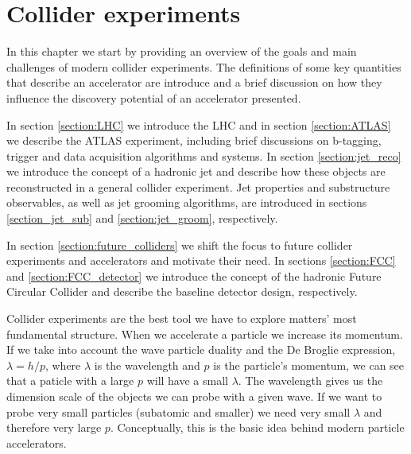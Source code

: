 
\chapter{Collider experiments}
\label{chapter:exp}

In this chapter we start by providing an overview of the goals and main challenges of modern collider experiments. The definitions of some key quantities that describe an accelerator are introduce and a brief discussion on how they influence the discovery potential of an accelerator presented. 

In section \ref{section:LHC} we introduce the LHC and in section \ref{section:ATLAS} we describe the ATLAS experiment, including brief discussions on b-tagging, trigger and data acquisition algorithms and systems. In section \ref{section:jet_reco} we introduce the concept of a hadronic jet and describe how these objects are reconstructed in a general collider experiment. Jet properties and substructure observables, as well as jet grooming algorithms, are introduced in sections \ref{section_jet_sub} and \ref{section:jet_groom}, respectively. 

In section \ref{section:future_colliders} we shift the focus to future collider experiments and accelerators and motivate their need. In sections \ref{section:FCC} and \ref{section:FCC_detector} we introduce the concept of the hadronic Future Circular Collider and describe the baseline detector design, respectively.

Collider experiments are the best tool we have to explore matters' most fundamental structure. 
When we accelerate a particle we increase its momentum. If we take into account the wave particle duality and the De Broglie expression, $\lambda=h/p$, where $\lambda$ is the wavelength and $p$ is the particle's momentum, we can see that a paticle with a large $p$ will have a small $\lambda$. The wavelength gives us the dimension scale of the objects we can probe with a given wave. If we want to probe very small particles (subatomic and smaller) we need very small $\lambda$ and therefore very large $p$. Conceptually, this is the basic idea behind modern particle accelerators. 

